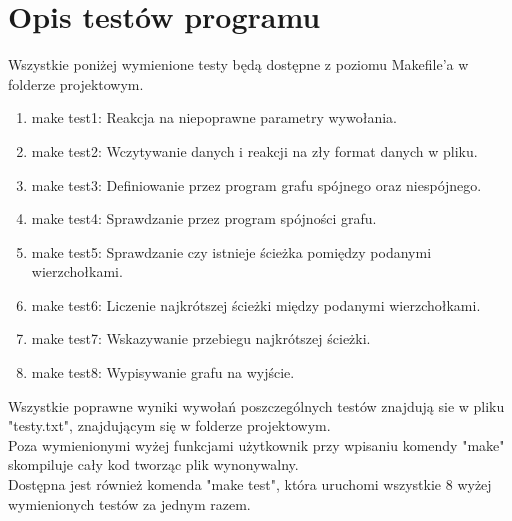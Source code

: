 \documentclass{article}
\begin{document}
\section{Opis testów programu}
Wszystkie poniżej wymienione testy będą dostępne z poziomu Makefile'a w folderze projektowym. 
\begin{enumerate}
    \item make test1: Reakcja na niepoprawne parametry wywołania.
    \item make test2: Wczytywanie danych i reakcji na zły format danych w pliku.
    \item make test3: Definiowanie przez program grafu spójnego oraz niespójnego.
    \item make test4: Sprawdzanie przez program spójności grafu.
    \item make test5: Sprawdzanie czy istnieje ścieżka pomiędzy podanymi wierzchołkami.
    \item make test6: Liczenie najkrótszej ścieżki między podanymi wierzchołkami.
    \item make test7: Wskazywanie przebiegu najkrótszej ścieżki.
    \item make test8: Wypisywanie grafu na wyjście.
\end{enumerate}
Wszystkie poprawne wyniki wywołań poszczególnych testów znajdują sie w pliku "testy.txt", znajdującym się w folderze projektowym.
\\
Poza wymienionymi wyżej funkcjami użytkownik przy wpisaniu komendy "make" skompiluje cały kod tworząc plik wynonywalny.
\\
Dostępna jest również komenda "make test", która uruchomi wszystkie 8 wyżej wymienionych testów za jednym razem. 
\\
\end{document}
